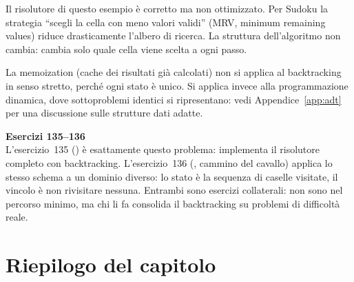 \begin{nota}
Il risolutore di questo esempio è corretto ma non ottimizzato.
Per Sudoku la strategia ``scegli la cella con meno valori validi''
(MRV, minimum remaining values) riduce drasticamente l'albero
di ricerca. La struttura dell'algoritmo non cambia: cambia solo
quale cella viene scelta a ogni passo.

\medskip
La memoization (cache dei risultati già calcolati) non si applica
al backtracking in senso stretto, perché ogni stato è unico.
Si applica invece alla programmazione dinamica, dove sottoproblemi
identici si ripresentano: vedi Appendice~\ref{app:adt} per
una discussione sulle strutture dati adatte.
\end{nota}

\begin{workbook}
\textbf{Esercizi 135--136}\\[4pt]
L'esercizio~135 () è esattamente questo problema:
implementa il risolutore completo con backtracking.
L'esercizio~136 (, cammino del cavallo) applica
lo stesso schema a un dominio diverso: lo stato è la sequenza di
caselle visitate, il vincolo è non rivisitare nessuna.
Entrambi sono esercizi collaterali: non sono nel percorso minimo,
ma chi li fa consolida il backtracking su problemi di difficoltà reale.
\end{workbook}

\section*{Riepilogo del capitolo}


